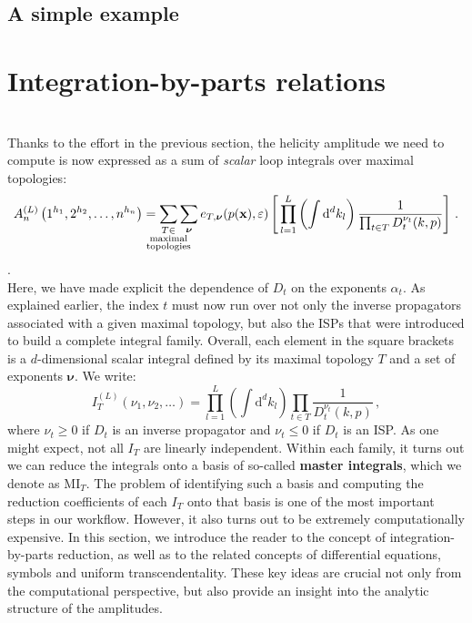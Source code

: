 \documentclass[main.tex]{subfiles}
\begin{document}
\subsection{A simple example}

\section{Integration-by-parts relations} \label{sec:IBP}
\\
Thanks to the effort in the previous section, the helicity amplitude we need to compute is now expressed as a sum of \textit{scalar} loop integrals over maximal topologies:
\begin{equation} \label{eq:ampreducedschematic}
    	A_n^{(L)} \left(1^{h_1}, 2^{h_2}, \ldots, n^{h_n} \right) =  
     \sum_{\mathclap{\substack{T \in \\ \text{maximal} \\ \text{topologies}}}} \sum_{\bm{\nu}} e_{T, \bm{\nu}}(p(\mathbf{x}), \varepsilon) \left[\, \prod_{l=1}^{L} \left(\int \mathrm{d}^d k_l \right) \frac{1}{\prod_{t\in T} D^{\nu_t}_t(k,p)} \right]\,.
\end{equation}
.\\
Here, we have made explicit the dependence of $D_t$ on the exponents $\alpha_t$. As explained earlier, the index $t$ must now run over not only the inverse propagators associated with a given maximal topology, but also the ISPs that were introduced to build a complete integral family. Overall, each element in the square brackets is a $d$-dimensional scalar integral defined by its maximal topology $T$ and a set of exponents $\bm{\nu}$. We write:
\begin{equation} \label{eq:ibpintegral}
    I_T^{(L)}(\nu_1, \nu_2, \ldots) = \prod_{l=1}^{L} \left(\int \mathrm{d}^d k_l \right) \prod_{t\in T} \frac{1}{D^{\nu_t}_t(k,p)}\,,
\end{equation}
where $\nu_t \geq 0$ if $D_t$ is an inverse propagator and $\nu_t\le0$ if $D_t$ is an ISP. As one might expect, not all $I_T$ are linearly independent. Within each family, it turns out we can reduce the integrals onto a basis of so-called \textbf{master integrals}, which we denote as $\text{MI}_T$. The problem of identifying such a basis and computing the reduction coefficients of each $I_T$ onto that basis is one of the most important steps in our workflow. However, it also turns out to be extremely computationally expensive. In this section, we introduce the reader to the concept of integration-by-parts reduction, as well as to the related concepts of differential equations, symbols and uniform transcendentality. These key ideas are crucial not only from the computational perspective, but also provide an insight into the analytic structure of the amplitudes.
\end{document}
